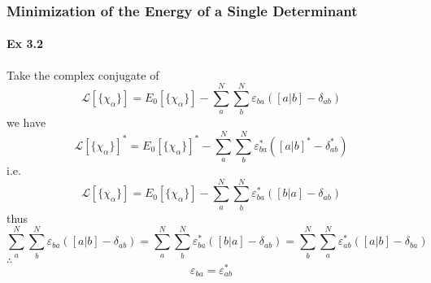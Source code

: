 \documentclass[a4paper]{article}
\newcommand{\ex}[1]{\paragraph{Ex #1}}
\numberwithin{equation}{subsection}
\begin{document}
\subsubsection{Minimization of the Energy of a Single Determinant}
\ex{3.2}
Take the complex conjugate of
\begin{equation}\label{key}
\mathscr{L}[\{\chi_\alpha\}] = E_0[\{\chi_\alpha\}] - \sum_a^N\sum_b^N \varepsilon_{ba}([a|b] - \delta_{ab})
\end{equation}
we have
\begin{equation}\label{key}
\mathscr{L}[\{\chi_\alpha\}]^* = E_0[\{\chi_\alpha\}]^* - \sum_a^N\sum_b^N \varepsilon_{ba}^*([a|b]^* - \delta_{ab}^*)
\end{equation}
i.e.
\begin{equation}\label{key}
\mathscr{L}[\{\chi_\alpha\}] = E_0[\{\chi_\alpha\}] - \sum_a^N\sum_b^N \varepsilon_{ba}^*([b|a] - \delta_{ab})
\end{equation}
thus
\begin{equation}\label{key}
\sum_a^N\sum_b^N \varepsilon_{ba}([a|b] - \delta_{ab}) = \sum_a^N\sum_b^N \varepsilon_{ba}^*([b|a] - \delta_{ab}) = \sum_b^N\sum_a^N \varepsilon_{ab}^*([a|b] - \delta_{ba})
\end{equation}
$ \therefore $
\begin{equation}\label{key}
\varepsilon_{ba} = \varepsilon_{ab}^*
\end{equation}
\end{document}
